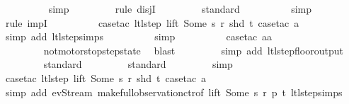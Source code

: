 \begin{isabellebody}
\ \ \ \ \ \ \ \ \isamarkupfalse%
\ simp\isanewline
\ \ \ \ \ \ \ \isamarkupfalse%
\ {\isacharparenleft}rule\ disjI{}{\isacharparenright}{\isacharplus}\isanewline
\ \ \ \ \ \ \ \isamarkupfalse%
\ standard\isanewline
\ \ \ \ \ \ \ \ \isamarkupfalse%
\ simp\isanewline
\ \ \ \ \ \ \ \ \isamarkupfalse%
\ {\isacharparenleft}rule\ impI{\isacharparenright}\isanewline
\ \ \ \ \ \ \ \ \isamarkupfalse%
\ {\isacharparenleft}case{\isacharunderscore}tac\ {\isachardoublequoteopen}ltl{\isacharunderscore}step\ lift\ {\isacharparenleft}Some\ s{\isacharparenright}\ r\ {\isacharparenleft}shd\ t{\isacharparenright}{\isachardoublequoteclose}{\isacharcomma}\ case{\isacharunderscore}tac\ a{\isacharparenright}\isanewline
\ \ \ \ \ \ \ \ \ \isamarkupfalse%
\ {\isacharparenleft}simp\ add{\isacharcolon}\ ltl{\isacharunderscore}step{\isachardot}simps{\isacharparenright}\isanewline
\ \ \ \ \ \ \ \ \isamarkupfalse%
\ simp\isanewline
\ \ \ \ \ \ \ \ \isamarkupfalse%
\ {\isacharparenleft}case{\isacharunderscore}tac\ {\isachardoublequoteopen}aa\ {\isasymin}\ {\isacharbraceleft}{}{\isacharcomma}\ {}{\isacharcomma}\ {}{\isacharcomma}\ {}{\isacharbraceright}{\isachardoublequoteclose}{\isacharparenright}\isanewline
\ \ \ \ \ \ \ \isamarkupfalse%
\ {}\isanewline
\ \ \ \ \ \ \ \isamarkupfalse%
\ not{\isacharunderscore}motorstop{\isacharunderscore}step{\isacharunderscore}state\ \isamarkupfalse%
\ blast\isanewline
\ \ \ \ \ \ \ \isamarkupfalse%
\ {\isacharparenleft}simp\ add{\isacharcolon}\ ltl{\isacharunderscore}step{\isacharunderscore}floor{\isacharunderscore}output{\isacharparenright}\isanewline
\ \ \ \ \ \ \ \isamarkupfalse%
\ standard\isanewline
\ \ \ \ \ \ \ \isamarkupfalse%
\ standard\isanewline
\ \ \ \ \ \ \ \isamarkupfalse%
\ simp\isanewline
\ \ \ \ \ \ \ \ \isamarkupfalse%
\ {\isacharparenleft}case{\isacharunderscore}tac\ {\isachardoublequoteopen}ltl{\isacharunderscore}step\ lift\ {\isacharparenleft}Some\ s{\isacharparenright}\ r\ {\isacharparenleft}shd\ t{\isacharparenright}{\isachardoublequoteclose}{\isacharcomma}\ case{\isacharunderscore}tac\ a{\isacharparenright}\isanewline
\ \ \ \ \ \ \ \ \ \isamarkupfalse%
\ {\isacharparenleft}simp\ add{\isacharcolon}\ ev{\isacharunderscore}Stream\ make{\isacharunderscore}full{\isacharunderscore}observation{\isachardot}ctr{\isacharbrackleft}of\ lift\ {\isachardoublequoteopen}Some\ s{\isachardoublequoteclose}\ r\ p\ t{\isacharbrackright}\ ltl{\isacharunderscore}step{\isachardot}simps{\isacharparenright}\isanewline

\end{isabellebody}
